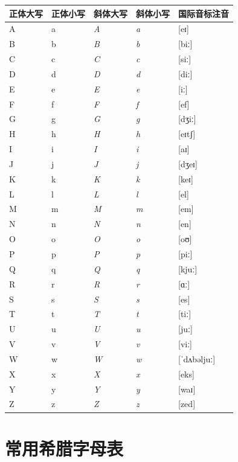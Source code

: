 {\def\LTcaptype{none} %
\begin{longtable}[]{@{}lllll@{}}
\toprule\noalign{}
正体大写 & 正体小写 & 斜体大写 & 斜体小写 & 国际音标注音 \\
\midrule\noalign{}
\endhead
\bottomrule\noalign{}
\endlastfoot
A & a & \emph{A} & \emph{a} & {[}eɪ{]} \\
B & b & \emph{B} & \emph{b} & {[}biː{]} \\
C & c & \emph{C} & \emph{c} & {[}siː{]} \\
D & d & \emph{D} & \emph{d} & {[}diː{]} \\
E & e & \emph{E} & \emph{e} & {[}iː{]} \\
F & f & \emph{F} & \emph{f} & {[}ef{]} \\
G & g & \emph{G} & \emph{g} & {[}dʒiː{]} \\
H & h & \emph{H} & \emph{h} & {[}eɪtʃ{]} \\
I & i & \emph{I} & \emph{i} & {[}aɪ{]} \\
J & j & \emph{J} & \emph{j} & {[}dʒeɪ{]} \\
K & k & \emph{K} & \emph{k} & {[}keɪ{]} \\
L & l & \emph{L} & \emph{l} & {[}el{]} \\
M & m & \emph{M} & \emph{m} & {[}em{]} \\
N & n & \emph{N} & \emph{n} & {[}en{]} \\
O & o & \emph{O} & \emph{o} & {[}oʊ{]} \\
P & p & \emph{P} & \emph{p} & {[}piː{]} \\
Q & q & \emph{Q} & \emph{q} & {[}kjuː{]} \\
R & r & \emph{R} & \emph{r} & {[}ɑː{]} \\
S & s & \emph{S} & \emph{s} & {[}es{]} \\
T & t & \emph{T} & \emph{t} & {[}tiː{]} \\
U & u & \emph{U} & \emph{u} & {[}juː{]} \\
V & v & \emph{V} & \emph{v} & {[}viː{]} \\
W & w & \emph{W} & \emph{w} & {[}ˈdʌbəljuː{]} \\
X & x & \emph{X} & \emph{x} & {[}eks{]} \\
Y & y & \emph{Y} & \emph{y} & {[}waɪ{]} \\
Z & z & \emph{Z} & \emph{z} & {[}zed{]} \\
\end{longtable}
}

\section{常用希腊字母表}

